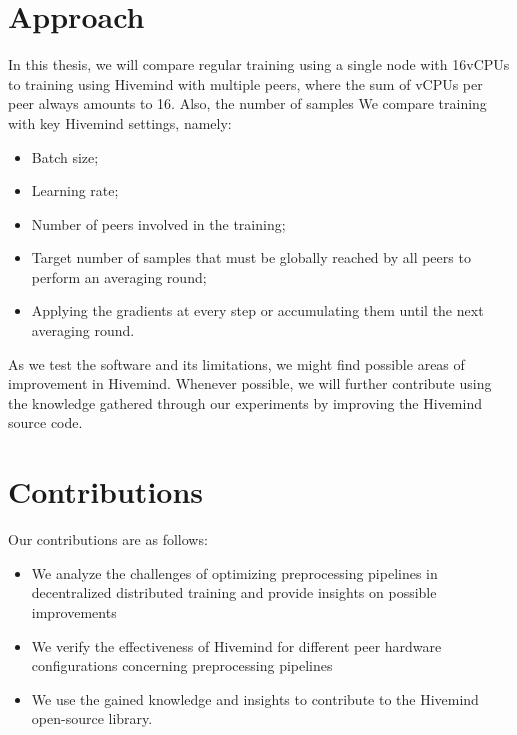 \section{Approach}

In this thesis, we will compare regular training using a single node with 16vCPUs to training using Hivemind with multiple peers, where the sum of vCPUs per peer always amounts to 16.
Also, the number of samples 
We compare training with key Hivemind settings, namely:
\begin{itemize}
    \item Batch size;
    \item Learning rate;
    \item Number of peers involved in the training;
    \item Target number of samples that must be globally reached by all peers to perform an averaging round;
    \item Applying the gradients at every step or accumulating them until the next averaging round.
\end{itemize}

As we test the software and its limitations, we might find possible areas of improvement in Hivemind.
Whenever possible, we will further contribute using the knowledge gathered through our experiments by improving the Hivemind \cite{hivemind} source code.

\section{Contributions}

Our contributions are as follows:
\begin{itemize}
    \item We analyze the challenges of optimizing preprocessing pipelines in decentralized distributed training and provide insights on possible improvements
    \item We verify the effectiveness of Hivemind for different peer hardware configurations concerning preprocessing pipelines
    \item We use the gained knowledge and insights to contribute to the Hivemind open-source library.
\end{itemize}
